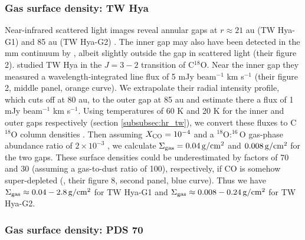 \documentclass[fleqn,usenatbib]{mnras}
\newcommand{\Sigg}{\Sigma_{\rm gas}}
\newcommand{\gcm}{\rm g/cm^2}
\begin{document}
\subsubsection{Gas surface density: TW Hya}
Near-infrared scattered light images reveal annular gaps at $r\approx 21$ au (TW Hya-G1) and 85 au (TW Hya-G2)  \citep{van-boekel_etal_2017}. The inner gap may also have been detected in the mm continuum by \cite{andrews_etal_2016}, albeit slightly outside the gap in scattered light (their figure 2). \cite{nomura_etal_2021} studied TW Hya in the $J=3-2$ transition of C$^{18}$O. Near the inner gap they measured a wavelength-integrated line flux of 5 mJy beam$^{-1}$ km s$^{-1}$ (their figure 2, middle panel, orange curve). We extrapolate their radial intensity profile, which cuts off at 80 au, to the outer gap at 85 au and estimate there a flux of 1 mJy beam$^{-1}$ km s$^{-1}$. 
Using temperatures of 60 K and 20 K for the inner and outer gaps respectively (section \ref{subsubsec:hr_tw}), we convert these fluxes to C$^{18}$O column densities \citep[e.g.][their equation B2]{mangum_shirley_2015}. Then assuming $X_{\rm CO} = 10^{-4}$ and a $^{18}$O$:^{16}$O gas-phase abundance ratio of $2 \times 10^{-3}$ \citep[e.g.][]{qi_etal_2011}, we calculate $\Sigg = 0.04\,\gcm$ and $0.008\,\gcm$ for the two gaps.
These surface densities could be underestimated by factors of 70 and 30 (assuming a gas-to-dust ratio of 100), respectively, if CO is somehow super-depleted  (\citealt{zhang_etal_2019}, their figure 8, second panel, blue curve). Thus we have $\Sigg \approx 0.04-2.8\,\gcm$ for TW Hya-G1 and $\Sigg \approx 0.008 - 0.24\,\gcm$ for TW Hya-G2.



\subsubsection{Gas surface density: PDS 70}
\label{subsubsec:gsd_pds70}
\end{document}
